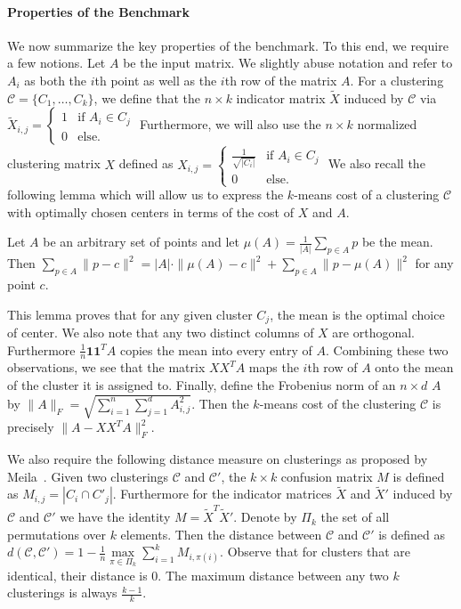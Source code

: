 \paragraph*{Properties of the Benchmark}

We now summarize the key properties of the benchmark.
To this end, we require a few notions.
Let $A$ be the input matrix. We slightly abuse notation and refer to $A_i$ as both the $i$th point as well as the $i$th row of the matrix $A$.
For a clustering $\mathcal{C}=\{C_1,\ldots ,C_k\}$, we define that the $n\times k$ indicator matrix $\tilde X$ induced by $\mathcal{C}$ via $\tilde X_{i,j} = \begin{cases}1 & \text{if } A_i\in C_j \\
0 & \text{else.} \end{cases}$
Furthermore, we will also use the $n\times k$ normalized clustering matrix $ X$ defined as
$X_{i,j} = \begin{cases}\frac{1}{\sqrt{|C_i|}} & \text{if } A_i\in C_j \\
0 & \text{else.} \end{cases}$
We also recall the following lemma which will allow us to express the $k$-means cost of a clustering $\mathcal{C}$ with optimally chosen centers in terms of the cost of $X$ and $A$.
\begin{lemma}[Folklore]
\label{lem:magic}
Let $A$ be an arbitrary set of points and let $\mu(A) = \frac{1}{|A|}\sum_{p\in A} p$ be the mean. Then $ \sum_{p\in A} \|p-c\|^2 = |A|\cdot \|\mu(A)-c\|^2 + \sum_{p\in A} \|p-\mu(A)\|^2$ for any point $c$.
\end{lemma}
This lemma proves that for any given cluster $C_j$, the mean is the optimal choice of center. 
We also note that any two distinct columns of $X$ are orthogonal. Furthermore $\frac{1}{n}\mathbf{1}\mathbf{1}^TA$ copies the mean into every entry of $A$. Combining these two observations, we see that the matrix $XX^TA$ maps the $i$th row of $A$ onto the mean of the cluster it is assigned to. Finally, define the Frobenius norm of an $n\times d$ $A$ by $\|A\|_F = \sqrt{\sum_{i=1}^n\sum_{j=1}^d A_{i,j}^2}$. Then the $k$-means cost of the clustering $\mathcal{C}$ is precisely
$\|A-XX^TA\|_F^2.$

We also require the following distance measure on clusterings as proposed by Meila~\cite{Meila05,Meila06}. Given two clusterings $\mathcal{C}$ and $\mathcal{C'}$, the $k\times k$ confusion matrix $M$ is defined as
$ M_{i,j} = |C_i\cap C'_j|.$
Furthermore for the indicator matrices $\tilde X$ and $\tilde X'$ induced by $\mathcal{C}$ and $\mathcal{C'}$ we have the identity $M=\tilde X^T {\tilde X'}$.
Denote by $\Pi_k$ the set of all permutations over $k$ elements. Then the distance between  $\mathcal{C}$ and $\mathcal{C'}$ is defined as $d(\mathcal{C},\mathcal{C'}) = 1-\frac{1}{n}\underset{\pi\in \Pi_k}{\max} \sum_{i=1}^k M_{i,\pi(i)}.$
Observe that for clusters that are identical, their distance is $0$. The maximum distance between any two $k$ clusterings is always $\frac{k-1}{k}$.

